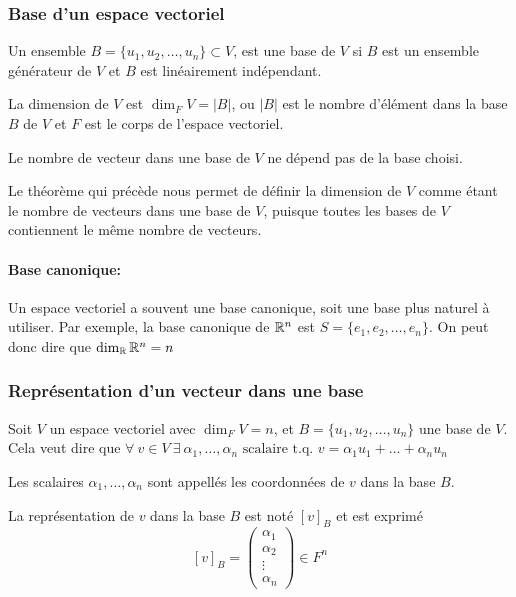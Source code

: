 \subsubsection{Base d'un espace vectoriel}
\begin{definition}
      Un ensemble $B = \{ u_1, u_2, \ldots, u_n \} \subset V$, est une base de $V$ si
      $B$ est un ensemble générateur de $V$ et $B$ est linéairement indépendant.
\end{definition}
\begin{definition}
      La dimension de $V$ est $\dim_F V = |B|$, ou $|B|$ est le nombre d'élément dans la base $B$
      de $V$ et $F$ est le corps de l'espace vectoriel.
\end{definition}
\begin{theorem}
      Le nombre de vecteur dans une base de $V$ ne dépend pas de la base choisi.
\end{theorem}
\begin{remark}
      Le théorème qui précède nous permet de définir la dimension de $V$ comme étant le
      nombre de vecteurs dans une base de $V$, puisque toutes les bases de $V$ contiennent
      le même nombre de vecteurs.
\end{remark}
\paragraph{Base canonique:}
Un espace vectoriel a souvent une base canonique, soit une base plus naturel à utiliser.
Par exemple, la base canonique de $\mathbb{R}^n$ est $S = \{ e_1, e_2, \ldots, e_n \}$.
On peut donc dire que $\dim_{\mathbb{R}} \mathbb{R}^n = n$

\subsubsection{Représentation d'un vecteur dans une base}
Soit $V$ un espace vectoriel avec $\dim_F V = n$, et $B = \{ u_1, u_2, \ldots, u_n \}$ une base de $V$. \\
Cela veut dire que $ \forall \ v \in V  \ \exists \ \alpha_1, \ldots, \alpha_n \text{ scalaire t.q. } v = \alpha_1 u_1 + \ldots + \alpha_n u_n$
\begin{definition}
      Les scalaires $\alpha_1, \ldots, \alpha_n$ sont appellés les coordonnées de $v$ dans la base $B$.
\end{definition}
\begin{definition}
      La représentation de $v$ dans la base $B$ est noté $[v]_B$ et est exprimé
      \[
            [v]_B = \begin{pmatrix}
                  \alpha_1 \\
                  \alpha_2 \\
                  \vdots   \\
                  \alpha_n
            \end{pmatrix} \in F^n
      \]
\end{definition}

